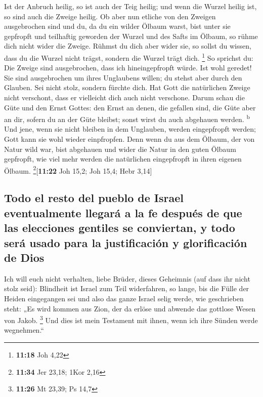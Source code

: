  Ist der Anbruch heilig, so ist auch der Teig heilig; und
wenn die Wurzel heilig ist, so sind auch die Zweige heilig.
 Ob aber nun etliche von den Zweigen ausgebrochen sind
und du, da du ein wilder Ölbaum warst, bist unter sie gepfropft und
teilhaftig geworden der Wurzel und des Safts im Ölbaum, 
so rühme dich nicht wider die Zweige. Rühmst du dich aber wider sie, so
sollst du wissen, dass du die Wurzel nicht trägst, sondern die Wurzel
trägt dich. \footnote{\textbf{11:18} Joh 4,22}  So
sprichst du: Die Zweige sind ausgebrochen, dass ich hineingepfropft
würde.  Ist wohl geredet! Sie sind ausgebrochen um ihres
Unglaubens willen; du stehst aber durch den Glauben. Sei nicht stolz,
sondern fürchte dich.  Hat Gott die natürlichen Zweige
nicht verschont, dass er vielleicht dich auch nicht verschone.
 Darum schau die Güte und den Ernst Gottes: den Ernst an
denen, die gefallen sind, die Güte aber an dir, sofern du an der Güte
bleibst; sonst wirst du auch abgehauen werden. \textsuperscript{b}
 Und jene, wenn sie nicht bleiben in dem Unglauben,
werden eingepfropft werden; Gott kann sie wohl wieder einpfropfen.
 Denn wenn du aus dem Ölbaum, der von Natur wild war,
bist abgehauen und wider die Natur in den guten Ölbaum gepfropft, wie
viel mehr werden die natürlichen eingepfropft in ihren eigenen Ölbaum.
\footnote{\textbf{11:34} Jer 23,18; 1Kor 2,16}{[}\textbf{11:22} Joh
15,2; Joh 15,4; Hebr 3,14{]}

\hypertarget{todo-el-resto-del-pueblo-de-israel-eventualmente-llegaruxe1-a-la-fe-despuuxe9s-de-que-las-elecciones-gentiles-se-conviertan-y-todo-seruxe1-usado-para-la-justificaciuxf3n-y-glorificaciuxf3n-de-dios}{%
\subsection{Todo el resto del pueblo de Israel eventualmente llegará a
la fe después de que las elecciones gentiles se conviertan, y todo será
usado para la justificación y glorificación de
Dios}\label{todo-el-resto-del-pueblo-de-israel-eventualmente-llegaruxe1-a-la-fe-despuuxe9s-de-que-las-elecciones-gentiles-se-conviertan-y-todo-seruxe1-usado-para-la-justificaciuxf3n-y-glorificaciuxf3n-de-dios}}

 Ich will euch nicht verhalten, liebe Brüder, dieses
Geheimnis (auf dass ihr nicht stolz seid): Blindheit ist Israel zum Teil
widerfahren, so lange, bis die Fülle der Heiden eingegangen sei
 und also das ganze Israel selig werde, wie geschrieben
steht: „Es wird kommen aus Zion, der da erlöse und abwende das gottlose
Wesen von Jakob. \footnote{\textbf{11:26} Mt 23,39; Ps 14,7}
 Und dies ist mein Testament mit ihnen, wenn ich ihre
Sünden werde wegnehmen.``

